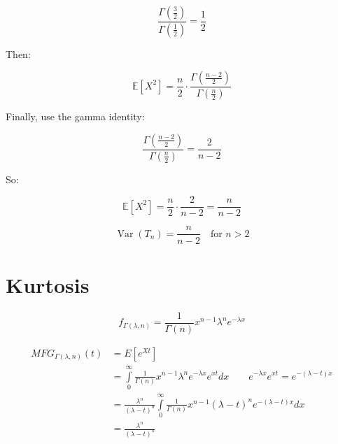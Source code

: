 \documentclass{article}
\begin{document}
\[
    \frac{\Gamma\left( \frac{3}{2} \right)}{\Gamma\left( \frac{1}{2} \right)} = \frac{1}{2}
\]

Then:

\[
    \mathbb{E}[X^2] = \frac{n}{2} \cdot \frac{\Gamma\left( \frac{n - 2}{2} \right)}{\Gamma\left( \frac{n}{2} \right)}
\]

Finally, use the gamma identity:

\[
    \frac{\Gamma\left( \frac{n - 2}{2} \right)}{\Gamma\left( \frac{n}{2} \right)} = \frac{2}{n - 2}
\]

So:

\[
    \mathbb{E}[X^2] = \frac{n}{2} \cdot \frac{2}{n - 2} = \frac{n}{n - 2}
\]

\[
    \boxed{\operatorname{Var}(T_n) = \frac{n}{n - 2} \quad \text{for } n > 2}
\]
\section{Kurtosis}
\[{f_{\Gamma \left( {\lambda ,n} \right)}} = \frac{1}{{\Gamma \left( n \right)}}{x^{n - 1}}{\lambda ^n}{e^{ - \lambda x}}\]

\[\begin{aligned}
        MF{G_{\Gamma \left( {\lambda ,n} \right)}}\left( t \right) & = E\left[ {{e^{Xt}}} \right]                                                                                                                                                                                     \\
                                                                   & = \int\limits_0^\infty  {\frac{1}{{\Gamma \left( n \right)}}{x^{n - 1}}{\lambda ^n}{e^{ - \lambda x}}{e^{xt}}dx} \qquad {e^{ - \lambda x}}{e^{xt}} = {e^{ - \left( {\lambda  - t} \right)x}}                     \\
                                                                   & = \frac{{{\lambda ^n}}}{{{{\left( {\lambda  - t} \right)}^n}}}\int\limits_0^\infty  {\frac{1}{{\Gamma \left( n \right)}}{x^{n - 1}}{{\left( {\lambda  - t} \right)}^n}{e^{ - \left( {\lambda  - t} \right)x}}dx} \\
                                                                   & = \frac{{{\lambda ^n}}}{{{{\left( {\lambda  - t} \right)}^n}}}                                                                                                                                                   \\
    \end{aligned} \]
\end{document}
